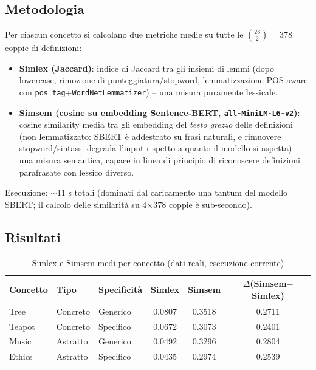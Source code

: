 \documentclass[12pt,a4paper]{article}
\begin{document}
\subsection{Metodologia}

Per ciascun concetto si calcolano due metriche medie su tutte le $\binom{28}{2}=378$ coppie di definizioni:

\begin{itemize}[noitemsep]
  \item \textbf{Simlex (Jaccard)}: indice di Jaccard tra gli insiemi di lemmi (dopo lowercase, rimozione di punteggiatura/stopword, lemmatizzazione POS-aware con \texttt{pos\_tag}+\texttt{WordNetLemmatizer}) -- una misura puramente lessicale.
  \item \textbf{Simsem (cosine su embedding Sentence-BERT, \texttt{all-MiniLM-L6-v2})}: cosine similarity media tra gli embedding del \emph{testo grezzo} delle definizioni (non lemmatizzato: SBERT \`e addestrato su frasi naturali, e rimuovere stopword/sintassi degrada l'input rispetto a quanto il modello si aspetta) -- una misura semantica, capace in linea di principio di riconoscere definizioni parafrasate con lessico diverso.
\end{itemize}

Esecuzione: $\sim$11 s totali (dominati dal caricamento una tantum del modello SBERT; il calcolo delle similarit\`a su 4$\times$378 coppie \`e sub-secondo).

\subsection{Risultati}

\begin{table}[H]
  \centering
  \caption{Simlex e Simsem medi per concetto (dati reali, esecuzione corrente)}
  \begin{tabular}{lllccc}
    \toprule
    \textbf{Concetto} & \textbf{Tipo} & \textbf{Specificit\`a} & \textbf{Simlex} & \textbf{Simsem} & \textbf{$\Delta$(Simsem$-$Simlex)} \\
    \midrule
    Tree   & Concreto & Generico  & 0.0807 & 0.3518 & 0.2711 \\
    Teapot & Concreto & Specifico & 0.0672 & 0.3073 & 0.2401 \\
    Music  & Astratto & Generico  & 0.0492 & 0.3296 & 0.2804 \\
    Ethics & Astratto & Specifico & 0.0435 & 0.2974 & 0.2539 \\
    \bottomrule
  \end{tabular}
\end{table}
\end{document}
